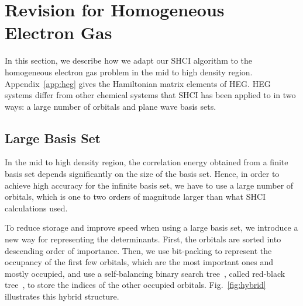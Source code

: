 \section{Revision for Homogeneous Electron Gas}
\label{HEG}

In this section, we describe how we adapt our SHCI algorithm to the homogeneous electron gas problem in the mid to high density region.
Appendix~\ref{app:heg} gives the Hamiltonian matrix elements of HEG.
HEG systems differ from other chemical systems that SHCI has been applied to in two ways: a large number of orbitals and plane wave basis sets.

\subsection{Large Basis Set}
In the mid to high density region, the correlation energy obtained from a finite basis set depends significantly on the size of the basis set.
Hence, in order to achieve high accuracy for the infinite basis set, we have to use a large number of orbitals, which is one to two orders of magnitude larger than what SHCI calculations used.

To reduce storage and improve speed when using a large basis set, we introduce a new way for representing the determinants.
First, the orbitals are sorted into descending order of importance.
Then, we use bit-packing to represent the occupancy of the first few orbitals, which are the most important ones and mostly occupied, and use a self-balancing binary search tree~\cite{wiki:binarysearchtree}, called red-black tree~\cite{wiki:redblacktree}, to store the indices of the other occupied orbitals.
Fig.~\ref{fig:hybrid} illustrates this hybrid structure.


